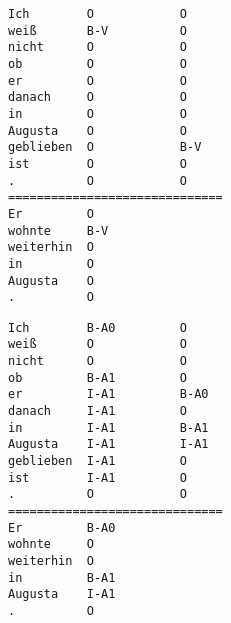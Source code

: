 \begin{srl}[!h]
\centering
\begin{minipage}{0.45\linewidth}
\vspace{0pt}
\begin{BVerbatim}[commandchars=\\\{\}, fontsize=\footnotesize]
Ich        O            O
weiß       B-V          O
nicht      O            O
ob         O            O
er         O            O
danach     O            O
in         O            O
Augusta    O            O
geblieben  O            B-V
ist        O            O
.          O            O
==============================
Er         O
wohnte     B-V
weiterhin  O
in         O
Augusta    O
.          O
\end{BVerbatim}
\end{minipage}
\hfill
\begin{minipage}{0.45\linewidth}
\vspace{0pt}
\begin{BVerbatim}[commandchars=\\\{\}, fontsize=\footnotesize]
Ich        B-A0         O
weiß       O            O
nicht      O            O
ob         B-A1         O
er         I-A1         B-A0
danach     I-A1         O
in         I-A1         B-A1
Augusta    I-A1         I-A1
geblieben  I-A1         O
ist        I-A1         O
.          O            O
==============================
Er         B-A0
wohnte     O
weiterhin  O
in         B-A1
Augusta    I-A1
.          O
\end{BVerbatim}
\end{minipage}
\end{srl}


